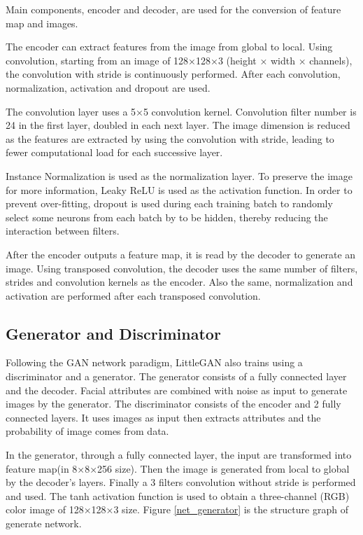 Main components, encoder and decoder, are used for the conversion of feature map and images.

The encoder can extract features from the image from global to local.
Using convolution, starting from an image of 128×128×3 (height × width × channels),
    the convolution with stride is continuously performed.
After each convolution, normalization, activation and dropout are used.

The convolution layer uses a 5×5 convolution kernel.
Convolution filter number is 24 in the first layer, doubled in each next layer.
The image dimension is reduced as the features are extracted by using the convolution with stride,
    leading to fewer computational load for each successive layer.

Instance Normalization is used as the normalization layer.
To preserve the image for more information, Leaky ReLU is used as the activation function.
In order to prevent over-fitting,
    dropout is used during each training batch to randomly select some neurons from each batch by to be hidden,
    thereby reducing the interaction between filters.

After the encoder outputs a feature map, it is read by the decoder to generate an image.
Using transposed convolution, the decoder uses the same number of filters,
    strides and convolution kernels as the encoder.
Also the same, normalization and activation are performed after each transposed convolution.

\subsection{Generator and Discriminator}

Following the GAN network paradigm, LittleGAN also trains using a discriminator and a generator.
The generator consists of a fully connected layer and the decoder.
Facial attributes are combined with noise as input to generate images by the generator.
The discriminator consists of the encoder and 2 fully connected layers.
It uses images as input then extracts attributes and the probability of image comes from data.


In the generator, through a fully connected layer, the input are transformed into feature map(in 8×8×256 size).
Then the image is generated from local to global by the decoder's layers.
Finally a 3 filters convolution without stride is performed and used.
The tanh activation function is used to obtain a three-channel (RGB) color image of 128×128×3 size.
Figure \ref{net_generator} is the structure graph of generate network.

